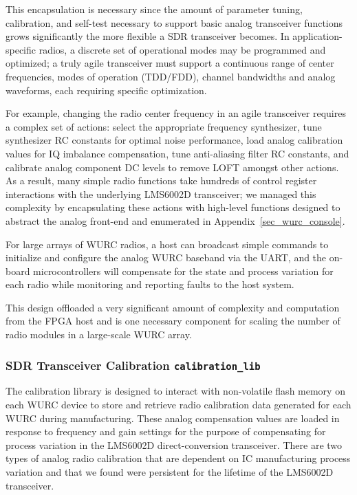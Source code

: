 	This encapsulation is necessary since the amount of parameter tuning, calibration, and self-test necessary to support basic analog transceiver functions grows significantly the more flexible a \ac{SDR} transceiver becomes.
	In application-specific radios, a discrete set of operational modes may be programmed and optimized; a truly agile transceiver must support a continuous range of center frequencies, modes of operation (TDD/FDD), channel bandwidths and analog waveforms, each requiring specific optimization.

	For example, changing the radio center frequency in an agile transceiver requires a complex set of actions: select the appropriate frequency synthesizer, tune synthesizer RC constants for optimal noise performance, load analog calibration values for IQ imbalance compensation, tune anti-aliasing filter RC constants, and calibrate analog component DC levels to remove \ac{LOFT} amongst other actions.
	As a result, many simple radio functions take hundreds of control register interactions with the underlying LMS6002D transceiver; we managed this complexity by encapsulating these actions with high-level functions designed to abstract the analog front-end and enumerated in Appendix~\ref{sec_wurc_console}.

	For large arrays of \ac{WURC} radios, a host can broadcast simple commands to initialize and configure the analog \ac{WURC} baseband via the \ac{UART}, and the on-board microcontrollers will compensate for the state and process variation for each radio while monitoring and reporting faults to the host system.
	
	This design offloaded a very significant amount of complexity and computation from the FPGA host and is one necessary component for scaling the number of radio modules in a large-scale \ac{WURC} array.

\subsubsection{SDR Transceiver Calibration \texttt{calibration\_lib}}
\label{sec_wurc_calibration}

	The calibration library is designed to interact with non-volatile flash memory on each \ac{WURC} device to store and retrieve radio calibration data generated for each \ac{WURC} during manufacturing.
	These analog compensation values are loaded in response to frequency and gain settings for the purpose of compensating for process variation in the LMS6002D direct-conversion transceiver.
		There are two types of analog radio calibration that are dependent on \ac{IC} manufacturing process variation and that we found were persistent for the lifetime of the LMS6002D transceiver.

